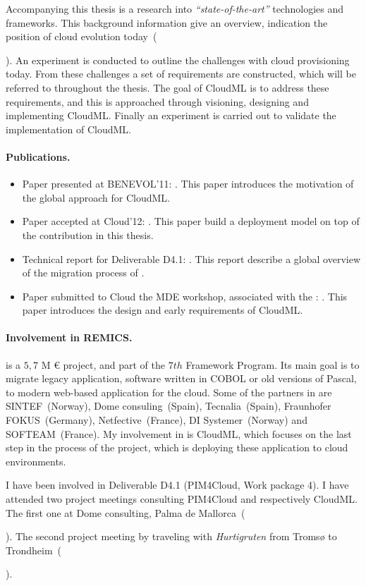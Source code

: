 Accompanying this thesis is a research into \emph{``state-of-the-art''} technologies and frameworks.
This background information give an overview, 
indication the position of cloud evolution today~(\date{April 2012}).
An experiment is conducted to outline the challenges with cloud provisioning today.
From these challenges a set of requirements are constructed, which will be
referred to throughout the thesis.
The goal of CloudML is to address these requirements,
and this is approached through visioning, designing and implementing CloudML.
Finally an experiment is carried out to validate the implementation of CloudML.

\paragraph{Publications.}

\begin{itemize}
  \item
    Paper presented at BENEVOL'11:
    .
    This paper introduces the motivation of the global approach for CloudML.
  \item
    Paper accepted at Cloud'12:
    .
    This paper build a deployment model on top of the contribution in this thesis.
  \item 
    Technical report for Deliverable D4.1:
    .
    This report describe a global overview of the migration process of .
  \item
    Paper submitted to Cloud the MDE workshop, associated with the :
    .
    This paper introduces the design and early requirements of CloudML.
\end{itemize}

\paragraph{Involvement in REMICS.}

 is a $5,7$ M {\euro} project, and part of the $7th$ Framework Program.
Its main goal is to migrate legacy application,
\eg software written in COBOL or old versions of Pascal,
to modern web-based application for the cloud.
Some of the partners in  are SINTEF~(Norway), Dome consuling~(Spain), 
Tecnalia~(Spain), Fraunhofer FOKUS~(Germany), Netfective~(France), 
DI Systemer~(Norway) and SOFTEAM~(France).
My involvement in  is CloudML,
which focuses on the last step in the process of the project,
which is deploying these application to cloud environments.

I have been involved in  Deliverable D4.1 (PIM4Cloud, Work package 4).
I have attended two project meetings consulting PIM4Cloud and respectively CloudML.
The first one at Dome consulting, Palma de Mallorca~(\date{June 2011}).
The second project meeting by traveling with \emph{Hurtigruten} from Troms{\o} to Trondheim~(\date{September 2011}).
